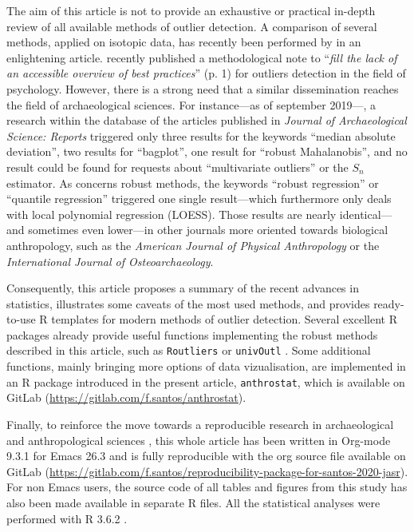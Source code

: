 \documentclass[review, 3p]{elsarticle}
\begin{document}
The aim of this article is not to provide an exhaustive or practical in-depth review of all available methods of outlier detection. A comparison of several methods, applied on isotopic data, has recently been performed by \cite{lightfoot2016_UseBiomineralOxygen} in an enlightening article. \cite{leys2019_HowClassifyDetect} recently published a methodological note to ``\emph{fill the lack of an accessible overview of best practices}'' (p. 1) for outliers detection in the field of psychology. However, there is a strong need that a similar dissemination reaches the field of archaeological sciences. For instance---as of september 2019---, a research within the database of the articles published in \emph{Journal of Archaeological Science: Reports} triggered only three results for the keywords ``median absolute deviation'', two results for ``bagplot'', one result for ``robust Mahalanobis'', and no result could be found for requests about ``multivariate outliers'' or the \(S_n\) estimator. As concerns robust methods, the keywords ``robust regression'' or ``quantile regression'' triggered one single result---which furthermore only deals with local polynomial regression (LOESS). Those results are nearly identical---and sometimes even lower---in other journals more oriented towards biological anthropology, such as the \emph{American Journal of Physical Anthropology} or the \emph{International Journal of Osteoarchaeology}.

Consequently, this article proposes a summary of the recent advances in statistics, illustrates some caveats of the most used methods, and provides ready-to-use R templates for modern methods of outlier detection. Several excellent R packages already provide useful functions implementing the robust methods described in this article, such as \texttt{Routliers} \citep{klein2019_RoutliersRobustOutliers} or \texttt{univOutl} \citep{dorazio2018_UnivOutlDetectionUnivariate}. Some additional functions, mainly bringing more options of data vizualisation, are implemented in an R package introduced in the present article, \texttt{anthrostat}, which is available on GitLab (\url{https://gitlab.com/f.santos/anthrostat}).

Finally, to reinforce the move towards a reproducible research in archaeological and anthropological sciences \citep{marwick2017_ComputationalReproducibilityArchaeological,marwick2017_OpenScienceArchaeology}, this whole article has been written in Org-mode 9.3.1 for Emacs 26.3 \citep{schulte2012_MultiLanguageComputingEnvironment,stanisic2015_EffectiveGitOrgMode} and is fully reproducible with the org source file available on GitLab (\url{https://gitlab.com/f.santos/reproducibility-package-for-santos-2020-jasr}). For non Emacs users, the source code of all tables and figures from this study has also been made available in separate R files. All the statistical analyses were performed with R 3.6.2 \citep{rcoreteam2019_LanguageEnvironmentStatistical}.
\end{document}
